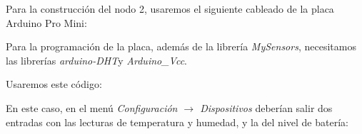 Para la construcción del nodo 2, usaremos el siguiente cableado de la placa
Arduino Pro Mini:


Para la programación de la placa, además de la librería \emph{MySensors},
necesitamos las librerías \emph{arduino-DHT}\footnotemark y
\emph{Arduino\_Vcc}\footnotemark.


Usaremos este código:



En este caso, en el menú \emph{Configuración $\rightarrow$ Dispositivos} deberían
salir dos entradas con las lecturas de temperatura y humedad, y la del nivel
de batería:

